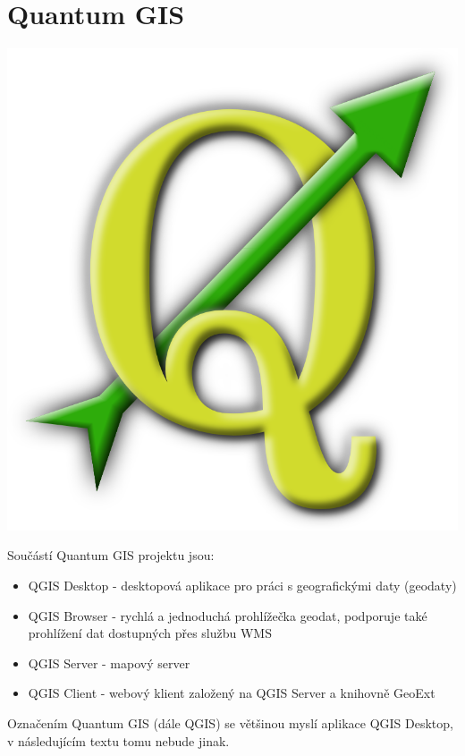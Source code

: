 \newpage
\section{Quantum GIS}

\nocite{qgis:www}

\begin{center}
	\includegraphics[scale=0.2]{pictures/qgis_logo}
\end{center}

\noindent Součástí Quantum GIS projektu jsou:
\begin{itemize}
	\item QGIS Desktop - desktopová aplikace pro práci s geografickými daty (geodaty)
	\item QGIS Browser - rychlá a jednoduchá prohlížečka geodat, podporuje také prohlížení dat dostupných přes službu WMS
	\item QGIS Server - mapový server 
	\item QGIS Client - webový klient založený na QGIS Server a knihovně GeoExt
\end{itemize}

Označením Quantum GIS (dále QGIS) se většinou myslí aplikace QGIS Desktop, v následujícím textu tomu nebude jinak.

